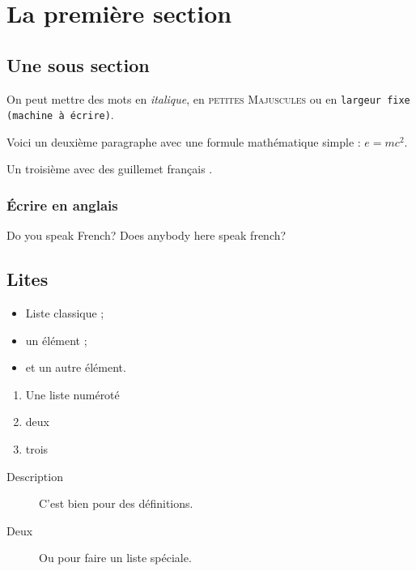 \documentclass[a4paper,11pt,final]{article}
\begin{document}
\cleardoublepage

%
  
\section{La première section}


\subsection{Une sous section}

On peut mettre des mots en \emph{italique}, 
en \textsc{petites Majuscules} ou 
en \texttt{largeur fixe (machine à écrire)}.

Voici un deuxième paragraphe avec une formule mathématique simple : $e = mc^2$.

Un troisième avec des \og guillemet français \fg{}.

\subsubsection{Écrire en anglais}

\foreignlanguage{english}{Do you speak French? Does anybody here speak french?}


\subsection{Lites}

\begin{itemize}
\item Liste classique ;
\item un élément ;
\item et un autre élément.
\end{itemize}
\vspace{\parskip} %

\begin{enumerate}
\item Une liste numéroté
\item deux
\item trois
\end{enumerate}
\vspace{\parskip}

\begin{description}
\item[Description] C'est bien pour des définitions.
\item[Deux] Ou pour faire un liste spéciale.
\end{description}
\vspace{\parskip}
\end{document}
